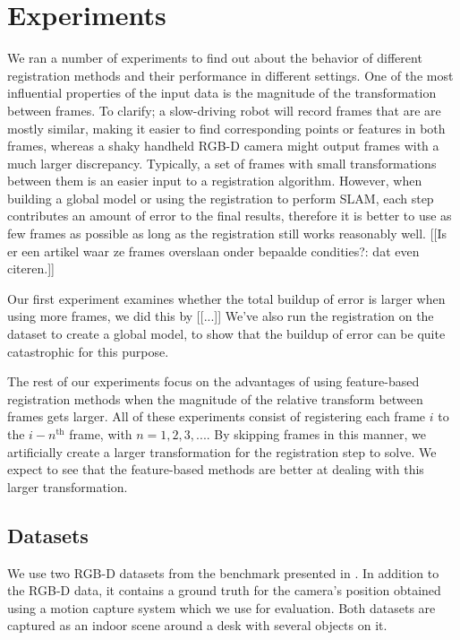 \documentclass[a4paper]{article}
\begin{document}
\section{Experiments}

We ran a number of experiments to find out about the behavior of different registration methods and their performance in different settings. One of the most influential properties of the input data is the magnitude of the transformation between frames. To clarify; a slow-driving robot will record frames that are are mostly similar, making it easier to find corresponding points or features in both frames, whereas a shaky handheld RGB-D camera might output frames with a much larger discrepancy. Typically, a set of frames with small transformations between them is an easier input to a registration algorithm. However, when building a global model or using the registration to perform SLAM, each step contributes an amount of error to the final results, therefore it is better to use as few frames as possible as long as the registration still works reasonably well. [[Is er een artikel waar ze frames overslaan onder bepaalde condities?: dat even citeren.]]

Our first experiment examines whether the total buildup of error is larger when using more frames, we did this by [[...]] We've also run the registration on the dataset to create a global model, to show that the buildup of error can be quite catastrophic for this purpose.

The rest of our experiments focus on the advantages of using feature-based registration methods when the magnitude of the relative transform between frames gets larger. All of these experiments consist of registering each frame $i$ to the $i-n^{\mathrm{th}}$ frame, with $n = 1,2,3,...$. By skipping frames in this manner, we artificially create a larger transformation for the registration step to solve. We expect to see that the feature-based methods are better at dealing with this larger transformation.

\subsection{Datasets}

We use two RGB-D datasets from the benchmark presented in \cite{sturm11rss-rgbd}. In addition to the RGB-D data, it contains a ground truth for the camera's position obtained using a motion capture system which we use for evaluation. Both datasets are captured as an indoor scene around a desk with several objects on it.
\end{document}

